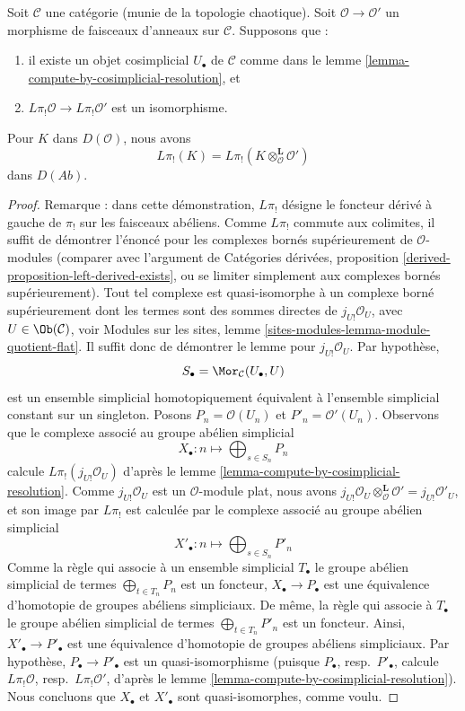 \begin{lemma}
\label{lemma-O-homology-qis}
Soit $\mathcal{C}$ une catégorie (munie de la topologie chaotique).
Soit $\mathcal{O} \to \mathcal{O}'$ un morphisme de faisceaux d'anneaux sur
$\mathcal{C}$. Supposons que :
\begin{enumerate}
\item il existe un objet cosimplicial $U_\bullet$ de $\mathcal{C}$ comme
dans le lemme \ref{lemma-compute-by-cosimplicial-resolution}, et
\item $L\pi_!\mathcal{O} \to L\pi_!\mathcal{O}'$ est un isomorphisme.
\end{enumerate}
Pour $K$ dans $D(\mathcal{O})$, nous avons
$$
L\pi_!(K) = L\pi_!(K \otimes_\mathcal{O}^\mathbf{L} \mathcal{O}')
$$
dans $D(\textit{Ab})$.
\end{lemma}

\begin{proof}
Remarque : dans cette démonstration, $L\pi_!$ désigne le foncteur dérivé à
gauche de $\pi_!$ sur les faisceaux abéliens.
Comme $L\pi_!$ commute aux colimites, il suffit de démontrer l'énoncé pour
les complexes bornés supérieurement de $\mathcal{O}$-modules (comparer avec
l'argument de Catégories dérivées, proposition
\ref{derived-proposition-left-derived-exists}, ou se limiter simplement aux
complexes bornés supérieurement). Tout tel complexe est quasi-isomorphe à un
complexe borné supérieurement dont les termes sont des sommes directes de
$j_{U!}\mathcal{O}_U$, avec $U \in \Ob(\mathcal{C})$, voir Modules sur les
sites, lemme \ref{sites-modules-lemma-module-quotient-flat}.
Il suffit donc de démontrer le lemme pour $j_{U!}\mathcal{O}_U$. Par
hypothèse,
$$
S_\bullet = \Mor_\mathcal{C}(U_\bullet, U)
$$
est un ensemble simplicial homotopiquement équivalent à l'ensemble simplicial
constant sur un singleton. Posons $P_n = \mathcal{O}(U_n)$ et
$P'_n = \mathcal{O}'(U_n)$. Observons que le complexe associé au groupe
abélien simplicial
$$
X_\bullet : n \longmapsto \bigoplus\nolimits_{s \in S_n} P_n
$$
calcule $L\pi_!(j_{U!}\mathcal{O}_U)$ d'après le
lemme \ref{lemma-compute-by-cosimplicial-resolution}.
Comme $j_{U!}\mathcal{O}_U$ est un $\mathcal{O}$-module plat, nous avons
$j_{U!}\mathcal{O}_U \otimes^\mathbf{L}_\mathcal{O} \mathcal{O}' =
j_{U!}\mathcal{O}'_U$, et son image par $L\pi_!$ est calculée par le complexe
associé au groupe abélien simplicial
$$
X'_\bullet : n \longmapsto \bigoplus\nolimits_{s \in S_n} P'_n
$$
Comme la règle qui associe à un ensemble simplicial $T_\bullet$ le groupe
abélien simplicial de termes $\bigoplus_{t \in T_n} P_n$ est un foncteur,
$X_\bullet \to P_\bullet$ est une équivalence d'homotopie de groupes
abéliens simpliciaux. De même, la règle qui associe à $T_\bullet$ le groupe
abélien simplicial de termes $\bigoplus_{t \in T_n} P'_n$ est un foncteur.
Ainsi, $X'_\bullet \to P'_\bullet$ est une équivalence d'homotopie de
groupes abéliens simpliciaux.
Par hypothèse, $P_\bullet \to P'_\bullet$ est un quasi-isomorphisme
(puisque $P_\bullet$, resp.\ $P'_\bullet$, calcule $L\pi_!\mathcal{O}$,
resp.\ $L\pi_!\mathcal{O}'$, d'après le
lemme \ref{lemma-compute-by-cosimplicial-resolution}).
Nous concluons que $X_\bullet$ et $X'_\bullet$ sont quasi-isomorphes, comme
voulu.
\end{proof}

